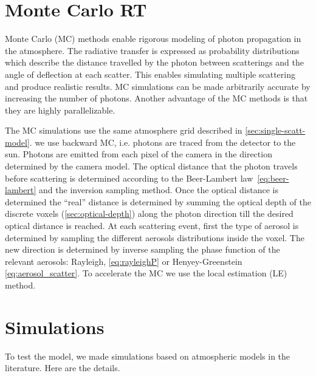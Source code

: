 \documentclass[10pt,letterpaper]{article}
\begin{document}

\section{Monte Carlo RT}
\label{sec:monte-carlo-simul}

Monte Carlo (MC) methods enable rigorous modeling of photon
propagation in the atmosphere. The radiative transfer is expressed as
probability distributions which describe the distance travelled by the
photon between scatterings and the angle of deflection at each
scatter.  This enables simulating multiple scattering and produce
realistic results.  MC simulations can be made arbitrarily accurate by
increasing the number of photons.  Another advantage of the MC methods
is that they are highly parallelizable.

The MC simulations use the same atmosphere grid described in
\cref{sec:single-scatt-model}. we use backward MC, i.e. photons are
traced from the detector to the sun. Photons are emitted from each
pixel of the camera in the direction determined by the camera
model. The optical distance that the photon travels before scattering
is determined according to the Beer-Lambert law~\cref{eq:beer-lambert}
and the inversion sampling method. Once the optical distance is
determined the ``real'' distance is determined by summing the optical
depth of the discrete voxels (\cref{sec:optical-depth}) along the
photon direction till the desired optical distance is reached.  At
each scattering event, first the type of aerosol is determined by
sampling the different aerosols distributions inside the voxel. The
new direction is determined by inverse sampling the phase function of
the relevant aerosols: Rayleigh, \cref{eq:rayleighP} or
Henyey-Greenstein \cref{eq:aerosol_scatter}.  To accelerate the MC we
use the local estimation (LE) method.



\section{Simulations}
\label{sec:simul}

To test the model, we made simulations based on atmospheric models in
the literature. Here are the details.
\end{document}
